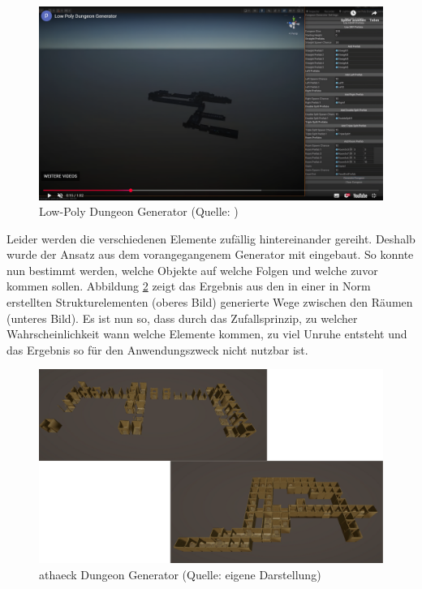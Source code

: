 \begin{figure}[ht]
\centering
\includegraphics[width=1\linewidth]{content/pictures/FirstSteps03.png}
\caption{Low-Poly Dungeon Generator (Quelle: \cite{past12pm_low_2024})}
\label{fig:dungeon-generator}
\end{figure}

Leider werden die verschiedenen Elemente zufällig hintereinander gereiht. Deshalb wurde der Ansatz aus dem vorangegangenem Generator mit eingebaut. So konnte nun bestimmt werden, welche Objekte auf welche Folgen und welche zuvor kommen sollen. Abbildung \ref{fig:athaeck-dungeon-generator} zeigt das Ergebnis aus den in einer in Norm erstellten Strukturelementen (oberes Bild) generierte Wege zwischen den Räumen (unteres Bild). Es ist nun so, dass durch das Zufallsprinzip, zu welcher Wahrscheinlichkeit wann welche Elemente kommen, zu viel Unruhe entsteht und das Ergebnis so für den Anwendungszweck nicht nutzbar ist.

\begin{figure}[ht]
\centering
\includegraphics[width=1\linewidth]{content/pictures/FirstSteps06.png}
\caption{athaeck Dungeon Generator (Quelle: eigene Darstellung)}
\label{fig:athaeck-dungeon-generator}
\end{figure}

